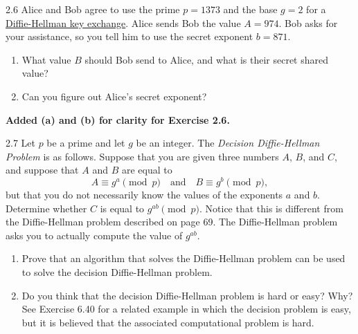
\begin{exercise}
    {2.6} Alice and Bob agree to use the prime $p = 1373$ and the base $g = 2$ for a \hyperlink{d-h key}{Diffie-Hellman key exchange}. Alice sends Bob the value $A = 974$. Bob asks for your assistance, so you tell him to use the secret exponent $b = 871$.
    \begin{enumerate}
        \item What value $B$ should Bob send to Alice, and what is their secret shared value?
        \item Can you figure out Alice's secret exponent?
    \end{enumerate}
\end{exercise}

\begin{center}
    \textbf{Added (a) and (b) for clarity for Exercise 2.6.}
\end{center}


\begin{exercise}
    {2.7} Let $p$ be a prime and let $g$ be an integer. The \textit{Decision Diffie-Hellman Problem} is as follows. Suppose that you are given three numbers $A$, $B$, and $C$, and suppose that $A$ and $B$ are equal to
    \[
        A \equiv g^a \pmod{p} \quad \text{and} \quad B \equiv g^b \pmod{p},
    \]
    but that you do not necessarily know the values of the exponents $a$ and $b$. Determine whether $C$ is equal to $g^{ab} \pmod{p}$. Notice that this is different from the Diffie-Hellman problem described on page 69. The Diffie-Hellman problem asks you to actually compute the value of $g^{ab}$.
    \begin{enumerate}
        \item Prove that an algorithm that solves the Diffie-Hellman problem can be used to solve the decision Diffie-Hellman problem.
        \item Do you think that the decision Diffie-Hellman problem is hard or easy? Why? See Exercise 6.40 for a related example in which the decision problem is easy, but it is believed that the associated computational problem is hard.
    \end{enumerate}
\end{exercise}

